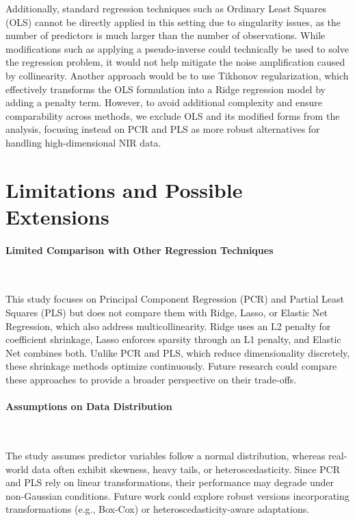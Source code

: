 \documentclass[11pt,twoside,a4paper]{article}
\begin{document}
Additionally, standard regression techniques such as Ordinary Least Squares (OLS) cannot be directly applied in this setting due to singularity issues, as the number of predictors is much larger than the number of observations. While modifications such as applying a pseudo-inverse could technically be used to solve the regression problem, it would not help mitigate the noise amplification caused by collinearity. Another approach would be to use Tikhonov regularization, which effectively transforms the OLS formulation into a Ridge regression model by adding a penalty term. However, to avoid additional complexity and ensure comparability across methods, we exclude OLS and its modified forms from the analysis, focusing instead on PCR and PLS as more robust alternatives for handling high-dimensional NIR data.


\section{Limitations and Possible Extensions}

\paragraph{Limited Comparison with Other Regression Techniques} \ \

This study focuses on Principal Component Regression (PCR) and Partial Least Squares (PLS) but does not compare them with Ridge, Lasso, or Elastic Net Regression, which also address multicollinearity. Ridge uses an L2 penalty for coefficient shrinkage, Lasso enforces sparsity through an L1 penalty, and Elastic Net combines both. Unlike PCR and PLS, which reduce dimensionality discretely, these shrinkage methods optimize continuously. Future research could compare these approaches to provide a broader perspective on their trade-offs.  

\paragraph{Assumptions on Data Distribution} \ \

The study assumes predictor variables follow a normal distribution, whereas real-world data often exhibit skewness, heavy tails, or heteroscedasticity. Since PCR and PLS rely on linear transformations, their performance may degrade under non-Gaussian conditions. Future work could explore robust versions incorporating transformations (e.g., Box-Cox) or heteroscedasticity-aware adaptations.  
\end{document}

